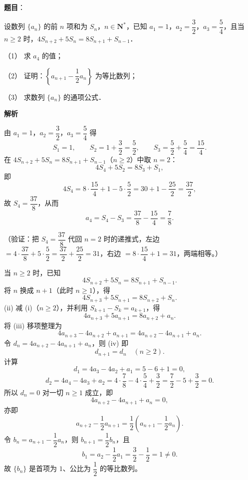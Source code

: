\begin{answer}

\textbf{题目}：

设数列 \(\{a_n\}\) 的前 \(n\) 项和为 \(S_n\)，\(n\in\mathbf{N}^{*}\)，已知 \(a_1=1\)，\(a_2=\dfrac{3}{2}\)，\(a_3=\dfrac{5}{4}\)，且当 \(n\geqslant 2\) 时，\(4S_{n+2}+5S_n=8S_{n+1}+S_{n-1}\)．

（1） 求 \(a_4\) 的值；

（2） 证明：\(\left\{a_{n+1}-\dfrac{1}{2}a_n\right\}\) 为等比数列；

（3） 求数列 \(\{a_n\}\) 的通项公式．

\textbf{解析}


由 \(a_1=1\)，\(a_2=\dfrac32\)，\(a_3=\dfrac54\) 得
\nopagebreak[4]
\[
S_1=1,\qquad S_2=1+\dfrac32=\dfrac52,\qquad S_3=\dfrac52+\dfrac54=\dfrac{15}{4}.
\]
在 \(4S_{n+2}+5S_n=8S_{n+1}+S_{n-1}\)（\(n\geqslant2\)）中取 \(n=2\)：
\nopagebreak[4]
\[
4S_4+5S_2=8S_3+S_1,
\]
即
\nopagebreak[4]
\[
4S_4=8\cdot\dfrac{15}{4}+1-5\cdot\dfrac52=30+1-\dfrac{25}{2}=\dfrac{37}{2},
\]
故 \(S_4=\dfrac{37}{8}\)，从而
\nopagebreak[4]
\[
a_4=S_4-S_3=\dfrac{37}{8}-\dfrac{15}{4}=\dfrac78.
\]

（验证：把 \(S_4=\dfrac{37}{8}\) 代回 \(n=2\) 时的递推式，左边 \(=4\cdot\dfrac{37}{8}+5\cdot\dfrac52=\dfrac{37}{2}+\dfrac{25}{2}=31\)，右边 \(=8\cdot\dfrac{15}{4}+1=31\)，两端相等。）


当 \(n\geqslant2\) 时，已知
\nopagebreak[4]
\[
4S_{n+2}+5S_n=8S_{n+1}+S_{n-1}. \tag*{(i)}
\]
将 \(n\) 换成 \(n+1\)（此时 \(n\geqslant1\)），得
\nopagebreak[4]
\[
4S_{n+3}+5S_{n+1}=8S_{n+2}+S_n. \tag*{(ii)}
\]
(ii) 减 (i)（\(n\geqslant2\)），并利用 \(S_{k+1}-S_k=a_{k+1}\)，得
\nopagebreak[4]
\[
4a_{n+3}+5a_{n+1}=8a_{n+2}+a_n. \tag*{(iii)}
\]
将 (iii) 移项整理为
\nopagebreak[4]
\[
4a_{n+3}-4a_{n+2}+a_{n+1}=4a_{n+2}-4a_{n+1}+a_n. \tag*{(iv)}
\]
令 \(d_n=4a_{n+2}-4a_{n+1}+a_n\)，则 (iv) 即
\nopagebreak[4]
\[
d_{n+1}=d_n\quad(n\geqslant2).
\]
计算
\nopagebreak[4]
\[
d_1=4a_3-4a_2+a_1=5-6+1=0,
\]
\nopagebreak[4]
\[
d_2=4a_4-4a_3+a_2=4\cdot\dfrac78-4\cdot\dfrac54+\dfrac32=\dfrac72-5+\dfrac32=0.
\]
所以 \(d_n=0\) 对一切 \(n\geqslant1\) 成立，即
\nopagebreak[4]
\[
4a_{n+2}-4a_{n+1}+a_n=0,
\]
亦即
\nopagebreak[4]
\[
a_{n+2}-\dfrac12a_{n+1}=\dfrac12\left(a_{n+1}-\dfrac12a_n\right).
\]
令 \(b_n=a_{n+1}-\dfrac12a_n\)，则 \(b_{n+1}=\dfrac12b_n\)，且
\nopagebreak[4]
\[
b_1=a_2-\dfrac12a_1=\dfrac32-\dfrac12=1\neq0.
\]
故 \(\{b_n\}\) 是首项为 \(1\)、公比为 \(\dfrac12\) 的等比数列。


\end{answer}
